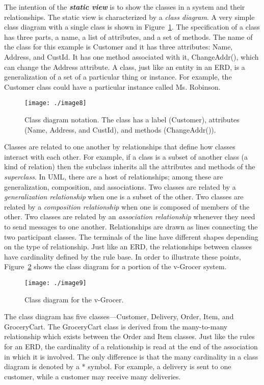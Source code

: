 The intention of the \emph{\textbf{static view}} is to show the classes
in a system and their relationships. The static view is characterized by
a \emph{class diagram}. A very simple class diagram with a single class
is shown in Figure~\ref{figure:classDiagram}. 
The specification of a class has three parts, a
name, a list of attributes, and a set of methods. The name of the class
for this example is Customer and it has three attributes: Name, Address,
and CustId. It has one method associated with it, ChangeAddr(), which
can change the Address attribute. A class, just like an entity in an
ERD, is a generalization of a set of a particular thing or instance. For
example, the Customer class could have a particular instance called Ms.
Robinson.

\begin{figure}[h]
\centering
\texttt{[image: ./image8]}
\caption{Class diagram notation. The class has a label
(Customer), attributes (Name, Address, and CustId), and methods
(ChangeAddr()).}
\label{figure:classDiagram}
\end{figure}

Classes are related to one another by relationships that define how
classes interact with each other. For example, if a class is a subset of
another class (a kind of relation) then the subclass inherits all the
attributes and methods of the \emph{superclass}. In UML, there are a
host of relationships; among these are generalization, composition, and
associations. Two classes are related by a \emph{generalization
relationship} when one is a subset of the other. Two classes are related
by a \emph{composition relationship} when one is composed of members of
the other. Two classes are related by an \emph{association relationship}
whenever they need to send messages to one another. Relationships are
drawn as lines connecting the two participant classes. The terminals of
the line have different shapes depending on the type of relationship.
Just like an ERD, the relationships between classes have cardinality
defined by the rule base. In order to illustrate these points, 
Figure~\ref{figure:classVgrocer} 
shows the class diagram for a portion of the v-Grocer system.

\begin{figure}[h]
\centering
\texttt{[image: ./image9]}
\caption{Class diagram for the v-Grocer.}
\label{figure:classVgrocer}
\end{figure}

The class diagram has five classes---Customer, Delivery, Order, Item,
and GroceryCart. The GroceryCart class is derived from the many-to-many
relationship which exists between the Order and Item classes. Just like
the rules for an ERD, the cardinality of a relationship is read at the
end of the association in which it is involved. The only difference is
that the many cardinality in a class diagram is denoted by a * symbol.
For example, a delivery is sent to one customer, while a customer may
receive many deliveries.

